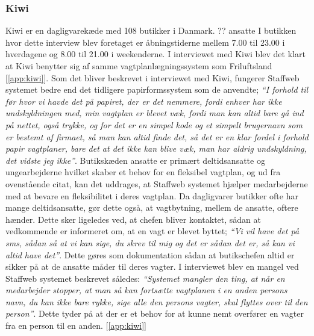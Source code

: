 \subsubsection{Kiwi}
Kiwi er en dagligvarekæde med 108 butikker i Danmark. ?? ansatte I butikken hvor dette interview blev foretaget er åbningstiderne mellem 7.00 til 23.00 i hverdagene og 8.00 til 21.00 i weekenderne. %
I interviewet med Kiwi blev det klart at Kiwi benytter sig af samme vagtplanlægningssystem som Friluftsland [\ref{app:kiwi}]. Som det bliver beskrevet i interviewet med Kiwi, fungerer Staffweb systemet bedre end det tidligere papirformssystem som de anvendte;\textit{ “I forhold til før hvor vi havde det på papiret, der er det nemmere, fordi enhver har ikke undskyldningen med, min vagtplan er blevet væk, fordi man kan altid bare gå ind på nettet, også trykke, og for det er en simpel kode og et simpelt brugernavn som er bestemt af firmaet, så man kan altid finde det, så det er en klar fordel i forhold papir vagtplaner, bare det at det ikke kan blive væk, man har aldrig undskyldning, det vidste jeg ikke”}. Butikskæden ansatte er primært deltidsansatte og ungearbejderne hvilket skaber et behov for en fleksibel vagtplan, og ud fra ovenstående citat, kan det uddrages, at Staffweb systemet hjælper medarbejderne med at bevare en fleksibilitet i deres vagtplan. Da dagligvarer butikker ofte har mange deltidsansatte, gør dette også, at vagtbytning, mellem de ansatte, oftere hænder. Dette sker ligeledes ved, at chefen bliver kontaktet, sådan at vedkommende er informeret om, at en vagt er blevet byttet;\textit{ “Vi vil have det på sms, sådan så at vi kan sige, du skrev til mig og det er sådan det er, så kan vi altid have det”}. Dette gøres som dokumentation sådan at butikschefen altid er sikker på at de ansatte måder til deres vagter.
I interviewet blev en mangel ved Staffweb systemet beskrevet således: \textit{“Systemet mangler den ting, at når en medarbejder stopper, at man så kan fortsætte vagtplanen i en anden persons navn, du kan ikke bare rykke, sige alle den persons vagter, skal flyttes over til den person”}. Dette tyder på at der er et behov for at kunne nemt overfører en vagter fra en person til en anden. [\ref{app:kiwi}]

